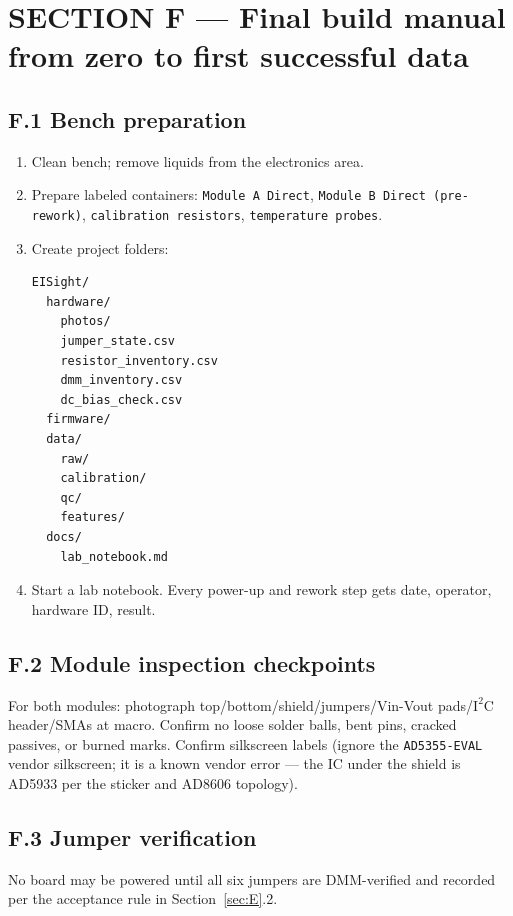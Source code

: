 \documentclass[11pt,a4paper]{article}
\begin{document}
\section{SECTION F --- Final build manual from zero to first successful data}
\label{sec:F}

\subsection{F.1 Bench preparation}

\begin{enumerate}
\item Clean bench; remove liquids from the electronics area.
\item Prepare labeled containers: \texttt{Module A Direct}, \texttt{Module B Direct (pre-rework)}, \texttt{calibration resistors}, \texttt{temperature probes}.
\item Create project folders:
\begin{verbatim}
EISight/
  hardware/
    photos/
    jumper_state.csv
    resistor_inventory.csv
    dmm_inventory.csv
    dc_bias_check.csv
  firmware/
  data/
    raw/
    calibration/
    qc/
    features/
  docs/
    lab_notebook.md
\end{verbatim}
\item Start a lab notebook. Every power-up and rework step gets date, operator, hardware ID, result.
\end{enumerate}

\subsection{F.2 Module inspection checkpoints}

For both modules: photograph top/bottom/shield/jumpers/Vin-Vout pads/$\mathrm{I^2C}$ header/SMAs at macro. Confirm no loose solder balls, bent pins, cracked passives, or burned marks. Confirm silkscreen labels (ignore the \texttt{AD5355-EVAL} vendor silkscreen; it is a known vendor error --- the IC under the shield is AD5933 per the sticker and AD8606 topology).

\subsection{F.3 Jumper verification}

\begin{gatebox}
No board may be powered until all six jumpers are DMM-verified and recorded per the acceptance rule in Section~\ref{sec:E}.2.
\end{gatebox}
\end{document}
